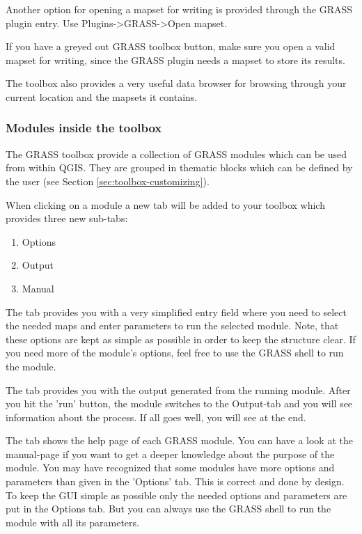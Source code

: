 Another option for opening a mapset for writing is provided through the 
GRASS plugin entry. Use Plugins->GRASS->Open mapset.
 
If you have a greyed out GRASS toolbox button, make sure you open a valid
mapset for writing, since the GRASS plugin needs a mapset to store its
results.

The toolbox also provides a very useful data browser for browsing through your
current location and the mapsets it contains.


\subsubsection{Modules inside the toolbox} 

The GRASS toolbox provide a collection of GRASS modules which can be used
from within QGIS. They are grouped in thematic blocks which can be defined 
by the user (see Section \ref{sec:toolbox-customizing}). 

When clicking on a module a new tab will be added to your toolbox which
provides three new sub-tabs:
\begin{enumerate}
\item Options
\item Output 
\item Manual
\end{enumerate}


The  tab provides you with a very simplified entry field where you need to 
select the needed maps and enter parameters to run the selected module.
Note, that these options are kept as simple as possible in order to keep
the structure clear. If you need more of the module's options, feel free to 
use the GRASS shell to run the module.


The  tab provides you with the output generated from the running module. After you hit the 
'run' button, the module switches to the Output-tab and you will see information about 
the process. If all goes well, you will see  at the end.


The  tab shows the help page of each GRASS module. You can have a look at the manual-page
if you want to get a deeper knowledge about the purpose of the module.
You may have recognized that some modules have more options and parameters than given in
the 'Options' tab. This is correct and done by design. To keep the GUI simple as possible
only the needed options and parameters are put in the Options tab. But you can always 
use the GRASS shell to run the module with all its parameters.

